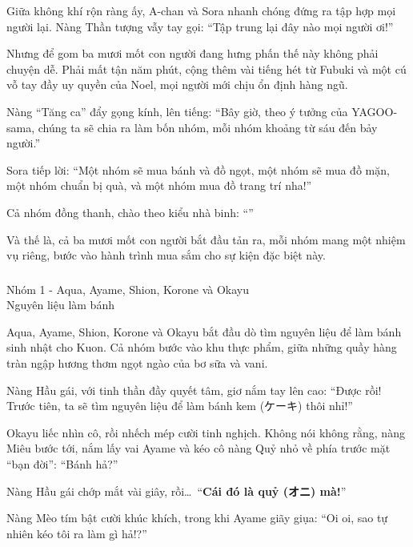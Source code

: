 \documentclass[../main.tex]{subfiles}
\begin{document}
Giữa không khí rộn ràng ấy, A-chan và Sora nhanh chóng đứng ra tập hợp mọi người lại. Nàng Thần tượng vẫy tay gọi: ``Tập trung lại đây nào mọi người ơi!''

Nhưng để gom ba mươi mốt con người đang hưng phấn thế này không phải chuyện dễ. Phải mất tận năm phút, cộng thêm vài tiếng hét từ Fubuki và một cú vỗ tay đầy uy quyền của Noel, mọi người mới chịu ổn định hàng ngũ.

Nàng ``Tăng ca'' đẩy gọng kính, lên tiếng: ``Bây giờ, theo ý tưởng của YAGOO-sama, chúng ta sẽ chia ra làm bốn nhóm, mỗi nhóm khoảng từ sáu đến bảy người.''

Sora tiếp lời: ``Một nhóm sẽ mua bánh và đồ ngọt, một nhóm sẽ mua đồ mặn, một nhóm chuẩn bị quà, và một nhóm mua đồ trang trí nha!''

Cả nhóm đồng thanh, chào theo kiểu nhà binh: ``\textbf{}''

Và thế là, cả ba mươi mốt con người bắt đầu tản ra, mỗi nhóm mang một nhiệm vụ riêng, bước vào hành trình mua sắm cho sự kiện đặc biệt này.

\vspace{-40pt}
\subsubsection*{\label{P1.1a}}

\begin{center}
    {\color{T1} Nhóm 1 - Aqua, Ayame, Shion, Korone và Okayu\\Nguyên liệu làm bánh}
\end{center}

Aqua, Ayame, Shion, Korone và Okayu bắt đầu dò tìm nguyên liệu để làm bánh sinh nhật cho Kuon. Cả nhóm bước vào khu thực phẩm, giữa những quầy hàng tràn ngập hương thơm ngọt ngào của bơ sữa và vani.

Nàng Hầu gái, với tinh thần đầy quyết tâm, giơ nắm tay lên cao: ``Được rồi! Trước tiên, ta sẽ tìm nguyên liệu để làm bánh kem (ケーキ) thôi nhỉ!''

Okayu liếc nhìn cô, rồi nhếch mép cười tinh nghịch. Không nói không rằng, nàng Miêu bước tới, nắm lấy vai Ayame và kéo cô nàng Quỷ nhỏ về phía trước mặt ``bạn đời'': ``Bánh hả?''

Nàng Hầu gái chớp mắt vài giây, rồi\dots\ ``\textbf{Cái đó là quỷ (オニ) mà!}''

Nàng Mèo tím bật cười khúc khích, trong khi Ayame giãy giụa: ``Oi oi, sao tự nhiên kéo tôi ra làm gì hả!?''
\end{document}
